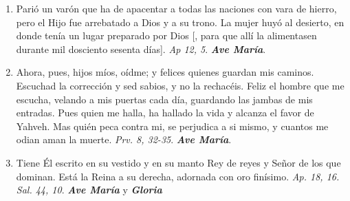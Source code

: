 \documentclass[../../devocionario.tex]{subfiles}
\begin{document}
\begin{enumerate}
        \item Parió un varón que ha de apacentar a todas las naciones con vara de hierro, pero el Hijo fue arrebatado a Dios y a su trono. La mujer huyó
            al desierto, en donde tenía un lugar preparado por Dios [, para que allí la alimentasen durante mil dosciento sesenta días]. \emph{Ap 12, 5}. \textbf{\emph{Ave María}}.

        \item Ahora, pues, hijos míos, oídme; y felices quienes guardan mis caminos. Escuchad la corrección y sed sabios, y no la rechacéis.  
            Feliz el hombre que me escucha, velando a mis puertas cada día, guardando las jambas de mis entradas. Pues quien me halla, ha hallado la vida y alcanza el favor 
            de Yahveh. Mas quién peca contra mi, se perjudica a si mismo, y cuantos me odian aman la muerte. \emph{Prv. 8, 32-35}. \textbf{\emph{Ave María}}.

        \item Tiene Él escrito en su vestido y en su manto Rey de reyes y Señor de los que dominan. Está la Reina a su derecha, adornada con oro finísimo. 
            \emph{Ap. 18, 16. Sal. 44, 10}. \textbf{\emph{Ave María}} y \textbf{\emph{Gloria}}

    \end{enumerate}
\end{document}
